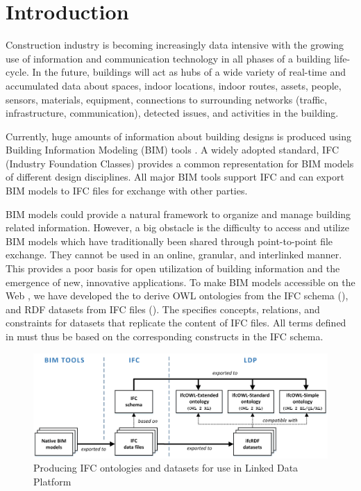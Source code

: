\section{Introduction}
\label{sec:Introduction}

Construction industry is becoming increasingly data intensive with the growing use of
information and communication technology in all phases of a building life-cycle. 
In the future, buildings will act as hubs of a wide variety of real-time and accumulated data about
spaces, indoor locations, indoor routes, assets, people, sensors, materials, equipment, connections
to surrounding networks (traffic, infrastructure, communication), detected issues, and 
activities in the building.

Currently, huge amounts of information about building designs is produced  
using Building Information Modeling (BIM) tools \cite{eastman2011bim}. A widely adopted standard, 
IFC (Industry Foundation Classes) \cite{ISO16739,liebich2010unveiling} provides a common representation for BIM models of 
different design disciplines. All major BIM tools support IFC and can export BIM models to IFC files for exchange with other parties.

BIM models could provide a natural framework to organize and manage building related information. However, a big obstacle is the difficulty to access and utilize BIM models which have traditionally been shared through point-to-point file exchange. They cannot be used in an online, granular, and 
interlinked manner. This provides a poor basis for open utilization of building information and the 
emergence of new, innovative applications.
To make BIM models accessible on the Web \cite{torma2014wobd}, we have developed the 
 to 
derive OWL ontologies from the IFC schema (\ifcowl{}), and RDF datasets from IFC files 
(\ifcrdf{}). The \ifcowl{} specifies concepts, relations, and constraints for \ifcrdf{} datasets that replicate the content of IFC files. 
All terms defined in \ifcowl{}  must thus be based on the corresponding constructs in 
the IFC schema. 

\begin{figure}[h]
\centering
\includegraphics{images/ifcOWL-multilayers-6.png}
\caption{Producing IFC ontologies and datasets for use in Linked Data Platform}
\label{fig:ifcOWL-layers}
\end{figure}

